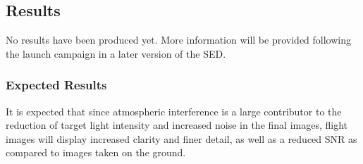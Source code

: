 \subsection{Results}

No results have been produced yet. More information will be provided following the launch campaign in a later version of the SED.

\subsubsection{Expected Results}

It is expected that since atmospheric interference is a large contributor to the reduction of target light intensity and increased noise in the final images, flight images will display increased clarity and finer detail, as well as a reduced SNR as compared to images taken on the ground. 
